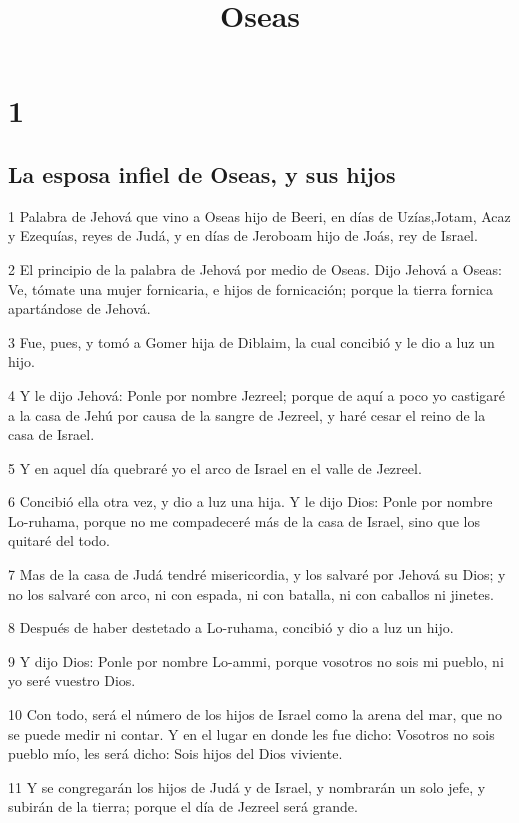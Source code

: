 

\title{Oseas}

\chapter{1}

\section*{La esposa infiel de Oseas, y sus hijos}

\par 1 Palabra de Jehová que vino a Oseas hijo de Beeri, en días de Uzías,Jotam, Acaz y Ezequías, reyes de Judá, y en días de Jeroboam hijo de Joás, rey de Israel.
\par 2 El principio de la palabra de Jehová por medio de Oseas. Dijo Jehová a Oseas: Ve, tómate una mujer fornicaria, e hijos de fornicación; porque la tierra fornica apartándose de Jehová.
\par 3 Fue, pues, y tomó a Gomer hija de Diblaim, la cual concibió y le dio a luz un hijo.
\par 4 Y le dijo Jehová: Ponle por nombre Jezreel; porque de aquí a poco yo castigaré a la casa de Jehú por causa de la sangre de Jezreel, y haré cesar el reino de la casa de Israel.
\par 5 Y en aquel día quebraré yo el arco de Israel en el valle de Jezreel.
\par 6 Concibió ella otra vez, y dio a luz una hija. Y le dijo Dios: Ponle por nombre Lo-ruhama, porque no me compadeceré más de la casa de Israel, sino que los quitaré del todo.
\par 7 Mas de la casa de Judá tendré misericordia, y los salvaré por Jehová su Dios; y no los salvaré con arco, ni con espada, ni con batalla, ni con caballos ni jinetes. 
\par 8 Después de haber destetado a Lo-ruhama, concibió y dio a luz un hijo.
\par 9 Y dijo Dios: Ponle por nombre Lo-ammi, porque vosotros no sois mi pueblo, ni yo seré vuestro Dios.
\par 10 Con todo, será el número de los hijos de Israel como la arena del mar, que no se puede medir ni contar. Y en el lugar en donde les fue dicho: Vosotros no sois pueblo mío, les será dicho: Sois hijos del Dios viviente. 
\par 11 Y se congregarán los hijos de Judá y de Israel, y nombrarán un solo jefe, y subirán de la tierra; porque el día de Jezreel será grande.

